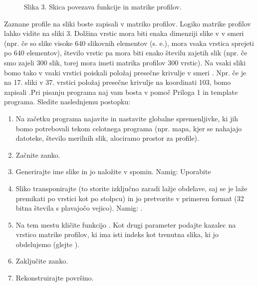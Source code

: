 \documentclass[letterpaper,10pt,english]{sphinxmanual}
\begin{document}
\begin{figure}[htbp]
\centering
\capstart

\noindent{}
\caption{Slika 3. Skica povezava funkcije  in matrike profilov.}\label{\detokenize{laserskiprofilomer:id3}}\end{figure}

\sphinxAtStartPar
Zaznane profile na sliki boste zapisali v matriko profilov. Logiko matrike profilov lahko vidite na sliki 3.
Dolžina vrstic mora biti enaka dimenziji slike v v smeri (npr. če so slike visoke 640 slikovnih elementov
(s. e.), mora vsaka vrstica sprejeti po 640 elementov), število vrstic pa mora biti enako številu zajetih
slik  (npr. če smo zajeli 300 slik, torej mora imeti matrika profilov 300 vrstic). Na vsaki sliki bomo tako
v vsaki vrstici poiskali položaj presečne krivulje v smeri . Npr. če je na 17. sliki v 37. vrstici položaj
presečne krivulje na koordinati 103, bomo zapisali .Pri pisanju programa naj vam bosta v pomoč Priloga 1 in template programa. Sledite naslednjemu
postopku:
\begin{enumerate}
%
\item {} 
\sphinxAtStartPar
Na začetku programa najavite in nastavite globalne spremenljivke, ki jih bomo potrebovali tekom celotnega programa (npr. mapa, kjer se nahajajo datoteke, število merilnih slik, alociramo prostor za profile).

\item {} 
\sphinxAtStartPar
Začnite zanko.

\item {} 
\sphinxAtStartPar
Generirajte ime slike in jo naložite v spomin. Namig: Uporabite 

\item {} 
\sphinxAtStartPar
Sliko transponirajte (to storite izključno zaradi lažje obdelave, saj se je laže premikati po vrstici kot po stolpcu) in jo pretvorite v primeren format (32 bitna števila s plavajočo vejico). Namig: .

\item {} 
\sphinxAtStartPar
Na tem mestu kličite funkcijo . Kot drugi parameter podajte kazalec na vrstico matrike profilov, ki ima isti indeks kot trenutna slika, ki jo obdelujemo (glejte ).

\item {} 
\sphinxAtStartPar
Zaključite zanko.

\item {} 
\sphinxAtStartPar
Rekonstruirajte površino.

\end{enumerate}
\end{document}
